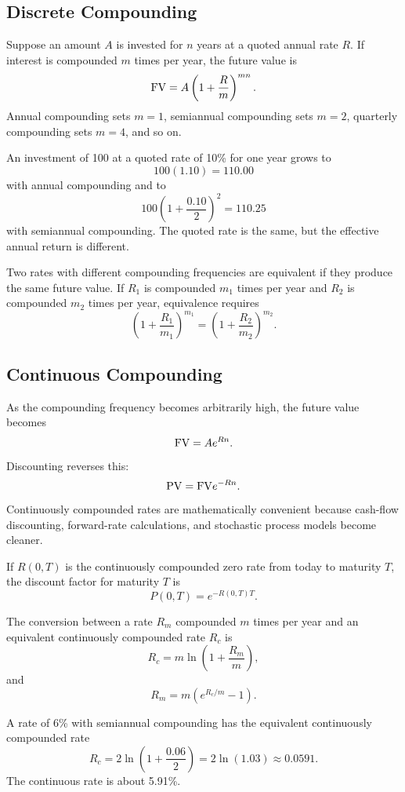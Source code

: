 \subsection{Discrete Compounding}

Suppose an amount $A$ is invested for $n$ years at a quoted annual rate $R$.
If interest is compounded $m$ times per year, the future value is
\[
    \mathrm{FV} = A\left(1+\frac{R}{m}\right)^{mn}.
\]
Annual compounding sets $m=1$, semiannual compounding sets $m=2$, quarterly
compounding sets $m=4$, and so on.

\begin{exmp}
An investment of 100 at a quoted rate of 10\% for one year grows to
\[
    100(1.10)=110.00
\]
with annual compounding and to
\[
    100\left(1+\frac{0.10}{2}\right)^2=110.25
\]
with semiannual compounding. The quoted rate is the same, but the effective
annual return is different.
\end{exmp}

Two rates with different compounding frequencies are equivalent if they produce
the same future value. If $R_1$ is compounded $m_1$ times per year and $R_2$ is
compounded $m_2$ times per year, equivalence requires
\[
    \left(1+\frac{R_1}{m_1}\right)^{m_1}
    =
    \left(1+\frac{R_2}{m_2}\right)^{m_2}.
\]

\subsection{Continuous Compounding}

As the compounding frequency becomes arbitrarily high, the future value becomes
\[
    \mathrm{FV} = Ae^{Rn}.
\]
Discounting reverses this:
\[
    \mathrm{PV} = \mathrm{FV} e^{-Rn}.
\]
Continuously compounded rates are mathematically convenient because cash-flow
discounting, forward-rate calculations, and stochastic process models become
cleaner.

\begin{defN}
If $R(0,T)$ is the continuously compounded zero rate from today to maturity
$T$, the discount factor for maturity $T$ is
\[
    P(0,T)=e^{-R(0,T)T}.
\]
\end{defN}

The conversion between a rate $R_m$ compounded $m$ times per year and an
equivalent continuously compounded rate $R_c$ is
\[
    R_c=m\ln\left(1+\frac{R_m}{m}\right),
\]
and
\[
    R_m=m\left(e^{R_c/m}-1\right).
\]

\begin{exmp}
A rate of 6\% with semiannual compounding has the equivalent continuously
compounded rate
\[
    R_c=2\ln\left(1+\frac{0.06}{2}\right)
    =2\ln(1.03)
    \approx 0.0591.
\]
The continuous rate is about 5.91\%.
\end{exmp}

